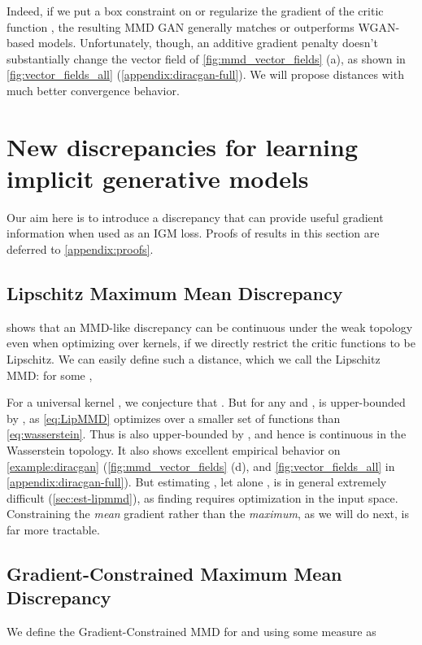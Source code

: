 \documentclass{article}
\begin{document}
Indeed, if we put a box constraint on  \parencite{mmd-gan}
or regularize the gradient of the critic function \parencite{Binkowski:2018},
the resulting MMD GAN generally matches or outperforms WGAN-based models.
Unfortunately, though,
an additive gradient penalty doesn't substantially change the vector field of \cref{fig:mmd_vector_fields} (a),
as shown in \cref{fig:vector_fields_all} (\cref{appendix:diracgan-full}).
We will propose distances with much better convergence behavior.








\section{New discrepancies for learning implicit generative models}\label{sec:new_discrepancies}

Our aim here is to introduce a discrepancy
that can provide useful gradient information when used as an IGM loss.
Proofs of results in this section are deferred to \cref{appendix:proofs}.






\subsection{Lipschitz Maximum Mean Discrepancy} \label{sec:lipmmd}
 shows that an MMD-like discrepancy
can be continuous under the weak topology
even when optimizing over kernels,
if we directly restrict the critic functions to be Lipschitz.
We can easily define such a distance, which we call the Lipschitz MMD: for some ,

For a universal kernel , we conjecture that .
But for any  and ,
 is upper-bounded by ,
as \eqref{eq:LipMMD} optimizes over a smaller set of functions than \eqref{eq:wasserstein}.
Thus
 is also upper-bounded by ,
and hence is continuous in the Wasserstein topology.
It also shows excellent empirical behavior on \cref{example:diracgan}
(\cref{fig:mmd_vector_fields} (d), and \cref{fig:vector_fields_all} in \cref{appendix:diracgan-full}).
But estimating , let alone ,
is in general extremely difficult (\cref{sec:est-lipmmd}),
as finding  requires optimization in the input space.
Constraining the \emph{mean} gradient rather than the \emph{maximum},
as we will do next,
is far more tractable.

\subsection{Gradient-Constrained Maximum Mean Discrepancy}
We define the Gradient-Constrained MMD
for 
and using some measure  as
\end{document}
